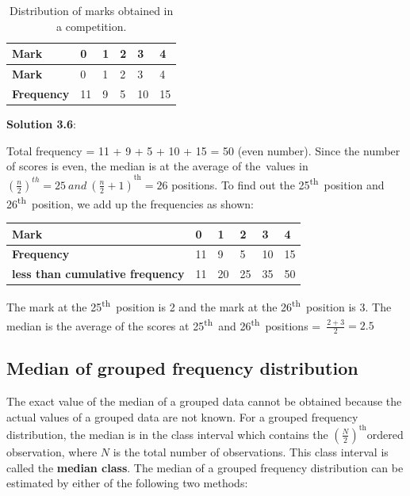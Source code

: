 \documentclass[
]{book}
\begin{document}
\begin{longtable}[]{@{}llllll@{}}
\caption{\label{tab:median} Distribution of marks obtained in a competition.}\tabularnewline
\toprule
\textbf{Mark} & 0 & 1 & 2 & 3 & 4 \\
\midrule
\endfirsthead
\toprule
\textbf{Mark} & 0 & 1 & 2 & 3 & 4 \\
\midrule
\endhead
\textbf{Frequency} & 11 & 9 & 5 & 10 & 15 \\
\bottomrule
\end{longtable}

\textbf{Solution 3.6}:

Total frequency = 11 + 9 + 5 + 10 + 15 = 50 (even number). Since the
number of scores is even, the median is at the average of the~values in
\({\left( \frac{n}{2} \right)^{th} = 25\ and\ \left( \frac{n}{2} + 1 \right)}^{\text{th}} = 26\)
positions. To find out the 25\textsuperscript{th}~position and 26\textsuperscript{th}~position, we add up the frequencies as shown:

\begin{longtable}[]{@{}llllll@{}}
\toprule
\textbf{Mark} & 0 & 1 & 2 & 3 & 4 \\
\midrule
\endhead
\textbf{Frequency} & 11 & 9 & 5 & 10 & 15 \\
\textbf{less than cumulative frequency} & 11 & 20 & 25 & 35 & 50 \\
\bottomrule
\end{longtable}

The mark at the 25\textsuperscript{th}~position is 2 and the mark at the 26\textsuperscript{th}~position
is 3. The median is the average of the scores at 25\textsuperscript{th}~and
26\textsuperscript{th}~positions =~\(\frac{2 + 3}{2} = 2.5\)

\hypertarget{median-of-grouped-frequency-distribution}{%
\subsection{Median of grouped frequency distribution}\label{median-of-grouped-frequency-distribution}}

The exact value of the median of a grouped data cannot be obtained
because the actual values of a grouped data are not known. For a grouped
frequency distribution, the median is in the class interval which
contains the \(\left( \frac{N}{2} \right)^{\text{th}}\)ordered
observation, where \(N\) is the total number of observations. This class
interval is called the \textbf{median class}. The median of a grouped
frequency distribution can be estimated by either of the following two
methods:
\end{document}
